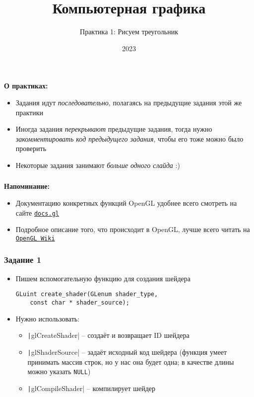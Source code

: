 \documentclass[10pt]{beamer}
\title{Компьютерная графика}
\subtitle{Практика 1: Рисуем треугольник}
\date{2023}
\begin{document}
\frame{\titlepage}

\begin{frame}[fragile]
\frametitle{}
\textbf{О практиках:}
\begin{itemize}
\item Задания идут \textit{последовательно}, полагаясь на предыдущие задания этой же практики
\item Иногда задания \textit{перекрывают} предыдущие задания, тогда нужно \textit{закомментировать код предыдущего задания}, чтобы его тоже можно было проверить
\item Некоторые задания занимают \textit{больше одного слайда} :)
\end{itemize}
\end{frame}

\begin{frame}[fragile]
\frametitle{}
\textbf{Напоминание:}
\begin{itemize}
\item Документацию конкретных функций OpenGL удобнее всего смотреть на сайте \href{https://docs.gl/}{\nolinkurl{docs.gl}}
\item Подробное описание того, что происходит в OpenGL, лучше всего читать на \href{https://www.khronos.org/opengl/wiki/Main_Page}{\texttt{OpenGL Wiki}}
\end{itemize}
\end{frame}

\begin{frame}[fragile]
\frametitle{Задание 1}
\begin{itemize}
\item Пишем вспомогательную функцию для создания шейдера
\begin{verbatim}
GLuint create_shader(GLenum shader_type,
    const char * shader_source);
\end{verbatim}
\item Нужно использовать:
\begin{itemize}
\item \texttt|glCreateShader| -- создаёт и возвращает ID шейдера
\item \texttt|glShaderSource| -- задаёт исходный код шейдера (функция умеет принимать массив строк, но у нас она будет одна; в качестве длины можно указать \verb|NULL|)
\item \texttt|glCompileShader| -- компилирует шейдер
\end{itemize}
\end{itemize}
\end{frame}
\end{document}
